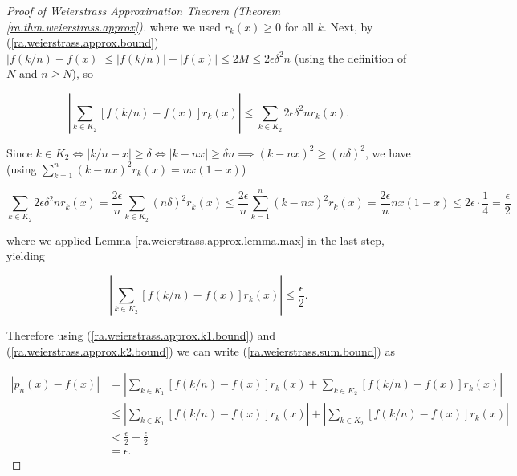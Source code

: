 \begin{proof}[Proof of Weierstrass Approximation Theorem (Theorem \ref{ra.thm.weierstrass.approx})]
where we used \(r_k(x ) \geq 0\) for all \(k\). Next, by (\ref{ra.weierstrass.approx.bound}) \(| f(k/n) - f(x) | \leq | f(k/n) | + |f(x)| \leq 2M \leq  2\epsilon \delta^2n \) (using the definition of \(N\) and \(n \geq N\)), so

\[
 \left|   \sum_{k \in K_2} \left[ f(k/n) - f(x) \right] r_k(x) \right|  \leq   \sum_{k \in K_2}   2\epsilon \delta^2nr_k(x).
 \]


Since \(k \in K_2 \iff \left| k/n - x \right| \geq \delta \iff \left| k -n x \right| \geq \delta n \implies (k-nx)^2 \geq (n \delta)^2\), we have (using \(\sum_{k =1}^n (k -nx)^2 r_k(x) = nx(1-x)\))

\[
\sum_{k \in K_2}   2\epsilon \delta^2nr_k(x) = \frac{2 \epsilon}{n} \sum_{k \in K_2} (n \delta)^2 r_k(x) \leq \frac{2 \epsilon}{n} \sum_{k =1}^n (k -nx)^2 r_k(x) = \frac{2 \epsilon}{n} nx(1-x) \leq 2 \epsilon  \cdot \frac{1}{4} = \frac{\epsilon}{2}
\]

where we applied Lemma \ref{ra.weierstrass.approx.lemma.max} in the last step, yielding

\begin{equation}\label{ra.weierstrass.approx.k2.bound}
 \left|   \sum_{k \in K_2} \left[ f(k/n) - f(x) \right] r_k(x) \right|  \leq \frac{\epsilon}{2}.
\end{equation}

Therefore using (\ref{ra.weierstrass.approx.k1.bound}) and (\ref{ra.weierstrass.approx.k2.bound}) we can write (\ref{ra.weierstrass.sum.bound}) as 

\begin{align*}
\left|  p_n(x) - f(x) \right| & = \left| \sum_{k \in K_1} \left[ f(k/n) - f(x) \right] r_k(x) +  \sum_{k \in K_2} \left[ f(k/n) - f(x) \right] r_k(x)\right|
\\ & \leq \left| \sum_{k \in K_1} \left[ f(k/n) - f(x) \right] r_k(x)\right| +  \left| \sum_{k \in K_2} \left[ f(k/n) - f(x) \right] r_k(x)\right|
\\ & < \frac{\epsilon}{2} + \frac{\epsilon}{2}
\\ & = \epsilon.
\end{align*}

\end{proof}

